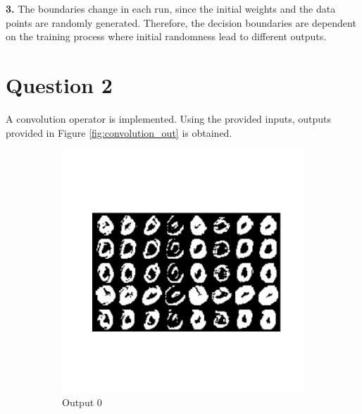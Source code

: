 \documentclass{assignment}
\begin{document}
\textbf{3.}
The boundaries change in each run, since the initial weights and the data points are randomly generated. Therefore, the decision boundaries are dependent on the training process where initial randomness lead to different outputs.


\section{Question 2}
A convolution operator is implemented. Using the provided inputs, outputs provided in Figure \ref{fig:convolution_out} is obtained.


\begin{figure}[htbp!]
    \begin{subfigure}{0.3\textwidth}
        \includegraphics[width=\textwidth]{figures/out_0.png}
        \caption{Output 0}
    \end{subfigure}\hfill
    \begin{subfigure}{0.3\textwidth}

\end{subfigure}
\end{figure}
\end{document}
